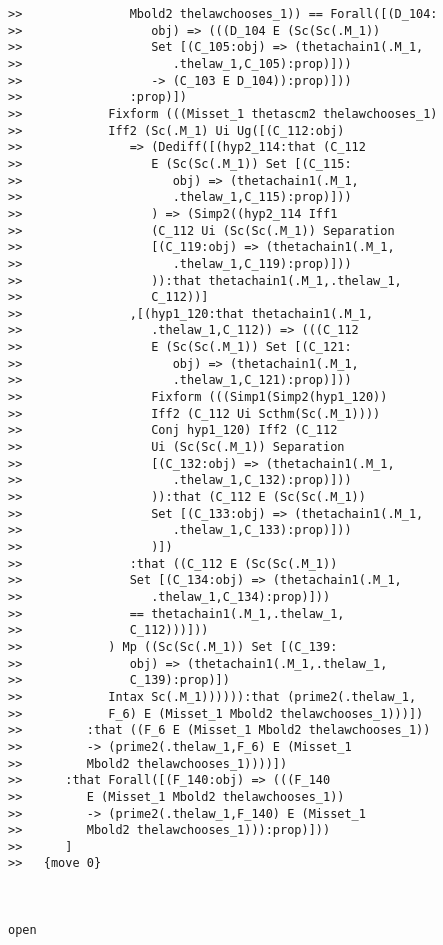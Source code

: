 \documentclass[12pt]{article}
\begin{document}
\begin{verbatim}
>>               Mbold2 thelawchooses_1)) == Forall([(D_104:
>>                  obj) => (((D_104 E (Sc(Sc(.M_1))
>>                  Set [(C_105:obj) => (thetachain1(.M_1,
>>                     .thelaw_1,C_105):prop)]))
>>                  -> (C_103 E D_104)):prop)]))
>>               :prop)])
>>            Fixform (((Misset_1 thetascm2 thelawchooses_1)
>>            Iff2 (Sc(.M_1) Ui Ug([(C_112:obj)
>>               => (Dediff([(hyp2_114:that (C_112
>>                  E (Sc(Sc(.M_1)) Set [(C_115:
>>                     obj) => (thetachain1(.M_1,
>>                     .thelaw_1,C_115):prop)]))
>>                  ) => (Simp2((hyp2_114 Iff1
>>                  (C_112 Ui (Sc(Sc(.M_1)) Separation
>>                  [(C_119:obj) => (thetachain1(.M_1,
>>                     .thelaw_1,C_119):prop)]))
>>                  )):that thetachain1(.M_1,.thelaw_1,
>>                  C_112))]
>>               ,[(hyp1_120:that thetachain1(.M_1,
>>                  .thelaw_1,C_112)) => (((C_112
>>                  E (Sc(Sc(.M_1)) Set [(C_121:
>>                     obj) => (thetachain1(.M_1,
>>                     .thelaw_1,C_121):prop)]))
>>                  Fixform (((Simp1(Simp2(hyp1_120))
>>                  Iff2 (C_112 Ui Scthm(Sc(.M_1))))
>>                  Conj hyp1_120) Iff2 (C_112
>>                  Ui (Sc(Sc(.M_1)) Separation
>>                  [(C_132:obj) => (thetachain1(.M_1,
>>                     .thelaw_1,C_132):prop)]))
>>                  )):that (C_112 E (Sc(Sc(.M_1))
>>                  Set [(C_133:obj) => (thetachain1(.M_1,
>>                     .thelaw_1,C_133):prop)]))
>>                  )])
>>               :that ((C_112 E (Sc(Sc(.M_1))
>>               Set [(C_134:obj) => (thetachain1(.M_1,
>>                  .thelaw_1,C_134):prop)]))
>>               == thetachain1(.M_1,.thelaw_1,
>>               C_112)))]))
>>            ) Mp ((Sc(Sc(.M_1)) Set [(C_139:
>>               obj) => (thetachain1(.M_1,.thelaw_1,
>>               C_139):prop)])
>>            Intax Sc(.M_1)))))):that (prime2(.thelaw_1,
>>            F_6) E (Misset_1 Mbold2 thelawchooses_1)))])
>>         :that ((F_6 E (Misset_1 Mbold2 thelawchooses_1))
>>         -> (prime2(.thelaw_1,F_6) E (Misset_1
>>         Mbold2 thelawchooses_1))))])
>>      :that Forall([(F_140:obj) => (((F_140
>>         E (Misset_1 Mbold2 thelawchooses_1))
>>         -> (prime2(.thelaw_1,F_140) E (Misset_1
>>         Mbold2 thelawchooses_1))):prop)]))
>>      ]
>>   {move 0}



open


\end{verbatim}
\end{document}
